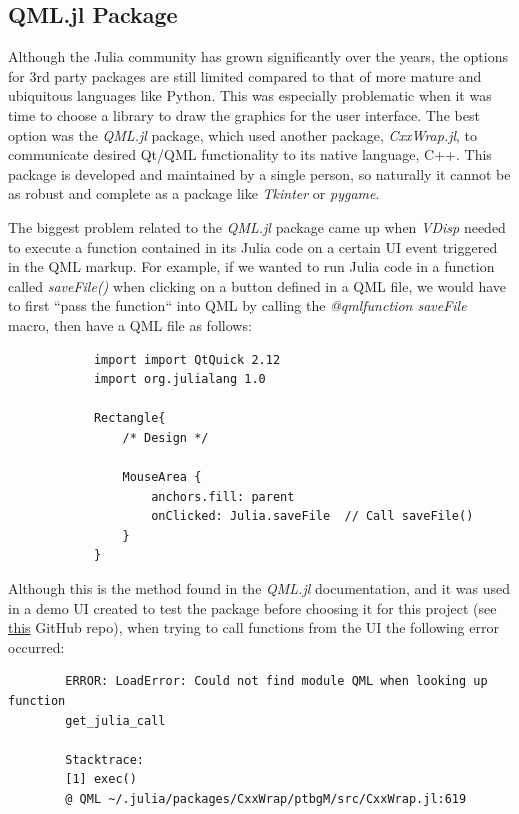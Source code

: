 \documentclass[11pt,fleqn]{article}
\newcommand{\indentpar}{\phantom{=}}
\begin{document}
    \subsection*{QML.jl Package}
        \indentpar Although the Julia community has grown significantly
        over the years, the options for 3rd party packages are still limited
        compared to that of more mature and ubiquitous languages like Python.
        This was especially problematic when it was time to choose a library 
        to draw the graphics for the user interface. The best option was the 
        \emph{QML.jl} package, which used another package, \emph{CxxWrap.jl},
        to communicate desired Qt/QML functionality to its native language, C++.
        This package is developed and maintained by a single person, so naturally
        it cannot be as robust and complete as a package like \emph{Tkinter} or 
        \emph{pygame}.

        \indentpar The biggest problem related to the \emph{QML.jl} package came up
        when \emph{VDisp} needed to execute a function contained in its Julia code on 
        a certain UI event triggered in the QML markup. For example, if we wanted to run 
        Julia code in a function called \emph{saveFile()} when clicking on a button defined
        in a QML file, we would have to first “pass the function“ into QML by calling the 
        \emph{@qmlfunction saveFile} macro, then have a QML file as follows:

        \begin{verbatim}
            import import QtQuick 2.12
            import org.julialang 1.0

            Rectangle{
                /* Design */
                
                MouseArea {
                    anchors.fill: parent
                    onClicked: Julia.saveFile  // Call saveFile()
                }
            }
        \end{verbatim}
        
        \indentpar Although this is the method found in the \emph{QML.jl} documentation,
        and it was used in a demo UI created to test the package before choosing it
        for this project (see \href{https://github.com/EmilSoleymani/JuliaThermostat}{this} 
        GitHub repo), when trying to call functions from the UI the following error 
        occurred:
        
        \begin{center}
        \begin{BVerbatim}
        ERROR: LoadError: Could not find module QML when looking up function 
        get_julia_call
        
        Stacktrace:
        [1] exec()
        @ QML ~/.julia/packages/CxxWrap/ptbgM/src/CxxWrap.jl:619
        \end{BVerbatim}
        \end{center}

\end{document}
